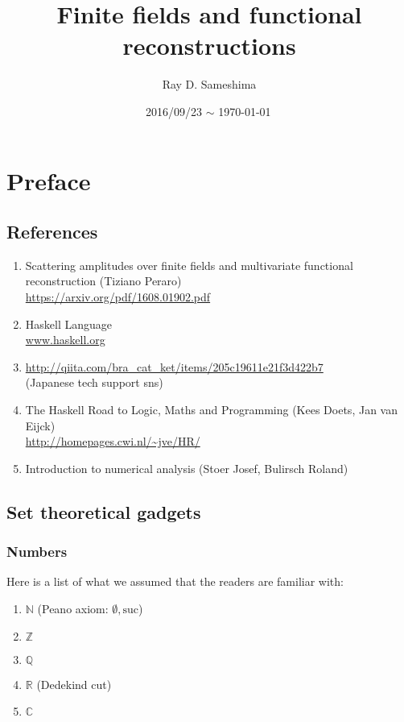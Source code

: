 \documentclass[11pt]{book}
\begin{document}
\newcommand{\Slash}[1]{{\ooalign{\hfil/\crcr$#1$}}}

\title{Finite fields and functional reconstructions}
\author{Ray D. Sameshima}
\date{2016/09/23 $\sim$ \today \, \currenttime}
\maketitle

\tableofcontents

\setcounter{chapter}{-1}
\chapter{Preface}
\section{References}
\begin{enumerate}
\item \label{Tiziano}
Scattering amplitudes over finite fields and multivariate functional reconstruction (Tiziano Peraro)\\
\url{https://arxiv.org/pdf/1608.01902.pdf}

\item Haskell Language \\
\url{www.haskell.org}

\item \url{http://qiita.com/bra_cat_ket/items/205c19611e21f3d422b7}\\
(Japanese tech support sns)

\item \label{Haskellroad}
The Haskell Road to Logic, Maths and Programming (Kees Doets, Jan van Eijck)\\
\url{http://homepages.cwi.nl/~jve/HR/}

\item \label{Numerical}
Introduction to numerical analysis (Stoer Josef, Bulirsch Roland)

\end{enumerate}

\section{Set theoretical gadgets}
\subsection{Numbers}
Here is a list of what we assumed that the readers are familiar with:
\begin{enumerate}
\item $\mathbb{N}$ (Peano axiom: $\emptyset, \text{suc}$)
\item $\mathbb{Z}$
\item $\mathbb{Q}$
\item $\mathbb{R}$ (Dedekind cut)
\item $\mathbb{C}$ 
\end{enumerate}
\end{document}
